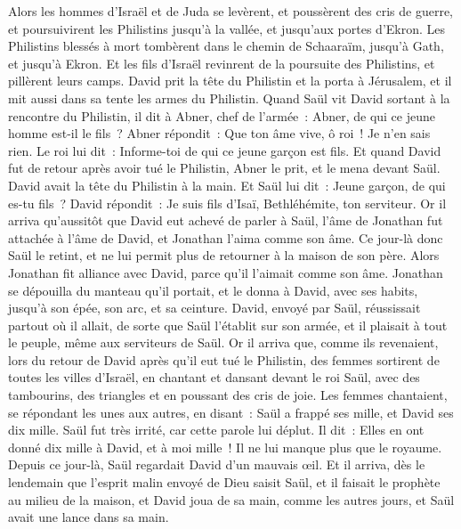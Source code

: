 \begin{multicols}{2}
Alors les hommes d'Israël et de Juda se levèrent, et poussèrent des cris de guerre, et poursuivirent les Philistins jusqu'à la vallée, et jusqu'aux portes d'Ekron. Les Philistins blessés à mort tombèrent dans le chemin de Schaaraïm, jusqu'à Gath, et jusqu'à Ekron.
Et les fils d'Israël revinrent de la poursuite des Philistins, et pillèrent leurs camps.
David prit la tête du Philistin et la porta à Jérusalem, et il mit aussi dans sa tente les armes du Philistin.
Quand Saül vit David sortant à la rencontre du Philistin, il dit à Abner, chef de l'armée~: Abner, de qui ce jeune homme est-il le fils~? Abner répondit~: Que ton âme vive, ô roi~! Je n'en sais rien.
Le roi lui dit~: Informe-toi de qui ce jeune garçon est fils.
Et quand David fut de retour après avoir tué le Philistin, Abner le prit, et le mena devant Saül. David avait la tête du Philistin à la main.
Et Saül lui dit~: Jeune garçon, de qui es-tu fils~? David répondit~: Je suis fils d'Isaï, Bethléhémite, ton serviteur.
\VerseOne{}Or il arriva qu'aussitôt que David eut achevé de parler à Saül, l'âme de Jonathan fut attachée à l'âme de David, et Jonathan l'aima comme son âme.
Ce jour-là donc Saül le retint, et ne lui permit plus de retourner à la maison de son père.
Alors Jonathan fit alliance avec David, parce qu'il l'aimait comme son âme.
Jonathan se dépouilla du manteau qu'il portait, et le donna à David, avec ses habits, jusqu'à son épée, son arc, et sa ceinture.
David, envoyé par Saül, réussissait partout où il allait, de sorte que Saül l'établit sur son armée, et il plaisait à tout le peuple, même aux serviteurs de Saül.
Or il arriva que, comme ils revenaient, lors du retour de David après qu'il eut tué le Philistin, des femmes sortirent de toutes les villes d'Israël, en chantant et dansant devant le roi Saül, avec des tambourins, des triangles et en poussant des cris de joie.
Les femmes chantaient, se répondant les unes aux autres, en disant~: Saül a frappé ses mille, et David ses dix mille.
Saül fut très irrité, car cette parole lui déplut. Il dit~: Elles en ont donné dix mille à David, et à moi mille~! Il ne lui manque plus que le royaume.
Depuis ce jour-là, Saül regardait David d'un mauvais œil.
Et il arriva, dès le lendemain que l'esprit malin envoyé de Dieu saisit Saül, et il faisait le prophète au milieu de la maison, et David joua de sa main, comme les autres jours, et Saül avait une lance dans sa main. 

\end{multicols}
